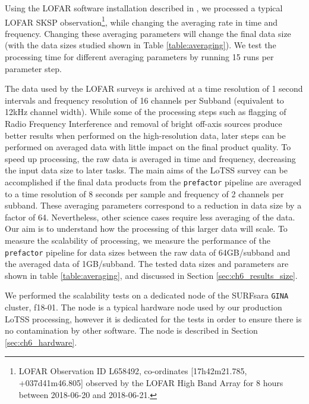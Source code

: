 Using the LOFAR software installation described in \cite{mechev17}, we processed a typical LOFAR SKSP observation\footnote{LOFAR Observation ID L658492, co-ordinates [17h42m21.785, +037d41m46.805] observed by the LOFAR High Band Array for 8 hours between 2018-06-20 and 2018-06-21.}, while changing the averaging rate  in time and frequency. Changing these averaging parameters will change the final data size (with the data sizes studied shown in Table \ref{table:averaging}). We test the processing time for different averaging parameters by running 15 runs per parameter step. 

The data used by the LOFAR surveys is archived at a time resolution of 1 second intervals and frequency resolution of 16 channels per \gls{Subband} (equivalent to 12kHz channel width). While some of the processing steps such as flagging of Radio Frequency Interference and removal of bright off-axis sources produce better results when performed on the high-resolution data, later steps can be performed on averaged data with little impact on the final product quality. To speed up processing, the raw data is averaged in time and frequency, decreasing the input data size to later tasks. The main aims of the \Gls{LoTSS} survey can be accomplished if the final data products from the \texttt{prefactor} pipeline are averaged to a time resolution of 8 seconds per sample and frequency of 2 channels per subband. These averaging parameters correspond to a reduction in data size by a factor of 64. Nevertheless, other science cases require less averaging of the data. Our aim is to understand how the processing of this larger data will scale. To measure the scalability of processing, we measure the performance of the \texttt{prefactor} pipeline for data sizes between the raw data of 64GB/subband and the averaged data of 1GB/subband. The tested data sizes and parameters are shown in table \ref{table:averaging}, and discussed in Section \ref{sec:ch6_results_size}.

We performed the scalability tests on a dedicated node of the SURFsara \texttt{GINA} cluster, f18-01. The node is a typical hardware node used by our production LoTSS processing, however it is dedicated for the tests in order to ensure there is no contamination by other software. The node is described in Section \ref{sec:ch6_hardware}. 
     

